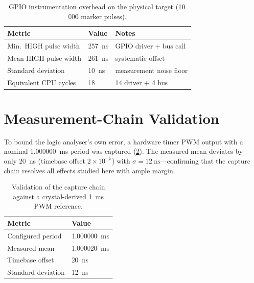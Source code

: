 \begin{table}[tb]
  \centering
  \caption[GPIO instrumentation overhead]{GPIO instrumentation overhead
    on the physical target (10\,000 marker pulses).}
  \label{tab:instrumentation}
  \small
  \begin{tabular}{@{}lll@{}}
    \toprule
    Metric & Value & Notes \\
    \midrule
    Min.\ HIGH pulse width & \SI{257}{\nano\second} & GPIO driver + bus call \\
    Mean HIGH pulse width  & \SI{261}{\nano\second} & systematic offset \\
    Standard deviation     & \SI{10}{\nano\second}  & measurement noise floor \\
    Equivalent CPU cycles  & 18                     & 14 driver + 4 bus \\
    \bottomrule
  \end{tabular}
\end{table}

\section{Measurement-Chain Validation}
\label{sec:eval:validation}

To bound the logic analyser's own error, a hardware timer PWM output
with a nominal \SI{1.000000}{\milli\second} period was captured
(\cref{tab:validation}). The measured mean deviates by only
\SI{20}{\nano\second} (timebase offset $2\times10^{-5}$) with
$\sigma = \SI{12}{\nano\second}$---confirming that the capture chain
resolves all effects studied here with ample margin.

\begin{table}[tb]
  \centering
  \caption[Logic-analyser validation]{Validation of the capture chain
    against a crystal-derived \SI{1}{\milli\second} PWM reference.}
  \label{tab:validation}
  \small
  \begin{tabular}{@{}ll@{}}
    \toprule
    Metric & Value \\
    \midrule
    Configured period  & \SI{1.000000}{\milli\second} \\
    Measured mean      & \SI{1.000020}{\milli\second} \\
    Timebase offset    & \SI{20}{\nano\second} \\
    Standard deviation & \SI{12}{\nano\second} \\
    \bottomrule
  \end{tabular}
\end{table}


